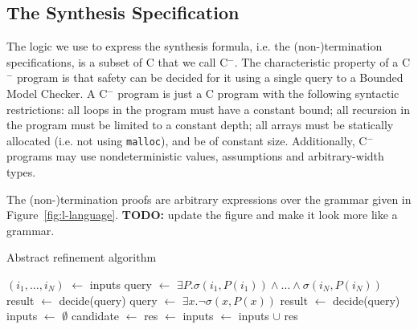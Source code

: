 \documentclass[preprint]{sigplanconf}
\theoremstyle{definition}
\newcommand{\todo}[1]{{\bf TODO:} #1}
\newcommand{\newC}{C$^-$\xspace}
\newcommand*\Let[2]{\State #1 $\gets$ #2}
\begin{document}
\subsection{The Synthesis Specification}
The logic we use to express the synthesis formula, i.e. the (non-)termination specifications, %
is a subset of C that we call \newC.  
The characteristic property of a \newC  program is that safety can be decided for
it using a single query to a Bounded Model Checker.  A \newC program is
just a C program with the following syntactic restrictions:
 all loops in the program must have a constant bound;
 all recursion in the program must be limited to a constant depth;
 all arrays must be statically allocated (i.e. not using \texttt{malloc}),
 and be of constant size.
Additionally, \newC programs may use nondeterministic values, assumptions
and arbitrary-width types.

The (non-)termination proofs are arbitrary expressions over the grammar given in Figure~\ref{fig:l-language}.  
\todo{update the figure and make it look more like a grammar.}


\begin{algorithm*}
 \caption{Abstract refinement algorithm
 \label{alg:cegis}}
 \vspace{-1.5em}
 \begin{multicols}{2}
 \begin{algorithmic}[1]
 \Statex
{}
  \Let{$(i_1, \ldots, i_N)$}{inputs}
  \Let{query}{$\exists P . \sigma(i_1, P(i_1)) \land \ldots \land \sigma(i_N, P(i_N))$}
  \Let{result}{decide(query)}
    \State {}
  \Else
    \State {}
  \EndIf
\EndFunction
\Statex
{}
  \Let{query}{$\exists x . \lnot \sigma(x, P(x))$}
  \Let{result}{decide(query)}
    \State {}
  \Else
    \State {}
  \EndIf
\EndFunction
\columnbreak
\Statex
{}
  \Let{inputs}{$\emptyset$}
  \Loop
    \Let{candidate}{}
      \State {}
    \EndIf
    \Let{res}{}
      \State {}
    \Else
      \Let{inputs}{inputs $\cup$ res}
    \EndIf
  \EndLoop
\EndFunction
 \end{algorithmic}
 \end{multicols}
\end{algorithm*}
\end{document}

